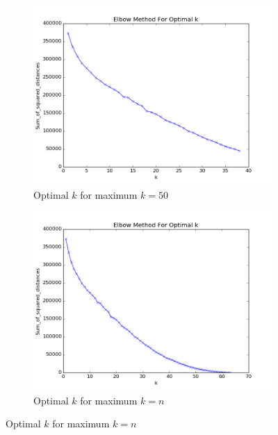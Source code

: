 \documentclass[20pt]{article} %
\begin{document}
\begin{figure}[!htbp]
  	\centering
   	\begin{subfigure}[!htbp]{0.7\linewidth}
    	\includegraphics[width=\linewidth]{./figures/kmax50.png}
	\caption{Optimal $k$ for maximum $k=50$}
   	\end{subfigure}
   	\begin{subfigure}[!htbp]{0.7\linewidth}
    	\includegraphics[width=\linewidth]{./figures/kmaxn.png}
	\caption{Optimal $k$ for maximum $k=n$}
   	\end{subfigure}
\end{figure} 
\end{document}
